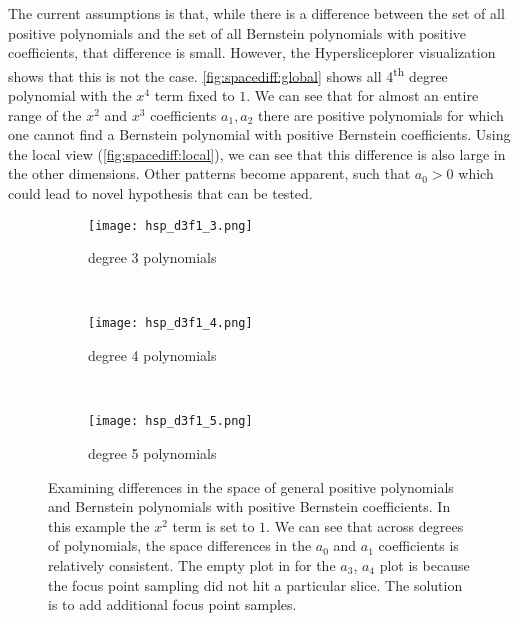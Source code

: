 The current assumptions is that, while there is a difference between the set of all positive polynomials and the set of all Bernstein polynomials with positive coefficients,
that difference is small. However, the Hypersliceplorer visualization shows
that this is not the case. \autoref{fig:spacediff:global} 
shows all 4\textsuperscript{th} degree polynomial with the $x^4$ term fixed to
$1$. We can see that for almost an entire range of the $x^2$ and $x^3$
coefficients $a_1, a_2$ there are positive polynomials for which one cannot find a
Bernstein polynomial with positive Bernstein coefficients. Using the local view
(\autoref{fig:spacediff:local}), we can see that this difference is also
large in the other dimensions. Other patterns become apparent, such that $a_0>0$ which could lead to novel hypothesis that can be tested.

\begin{figure*}
  \centering
  \begin{subfigure}[b]{0.3\textwidth}
    \texttt{[image: hsp\_d3f1\_3.png]}
    \caption{degree 3 polynomials}
    \label{fig:dimcmp:3}
  \end{subfigure}
  ~
  \begin{subfigure}[b]{0.3\textwidth}
    \texttt{[image: hsp\_d3f1\_4.png]}
    \caption{degree 4 polynomials}
    \label{fig:dimcmp:4}
  \end{subfigure}
  ~
  \begin{subfigure}[b]{0.3\textwidth}
    \texttt{[image: hsp\_d3f1\_5.png]}
    \caption{degree 5 polynomials}
    \label{fig:dimcmp:5}
  \end{subfigure}
  \caption{%
    Examining differences in the space of general positive polynomials and Bernstein 
    polynomials with positive Bernstein coefficients. In this example the 
    $x^2$ term is set to $1$. We can see that across degrees of polynomials,
    the space differences in the $a_0$ and $a_1$ coefficients is relatively
    consistent. The empty plot in  for the $a_3$, $a_4$
    plot is because the focus point sampling did not hit a particular slice.
    The solution is to add additional focus point samples. 
  }
  \label{fig:dimcmp}
\end{figure*}

